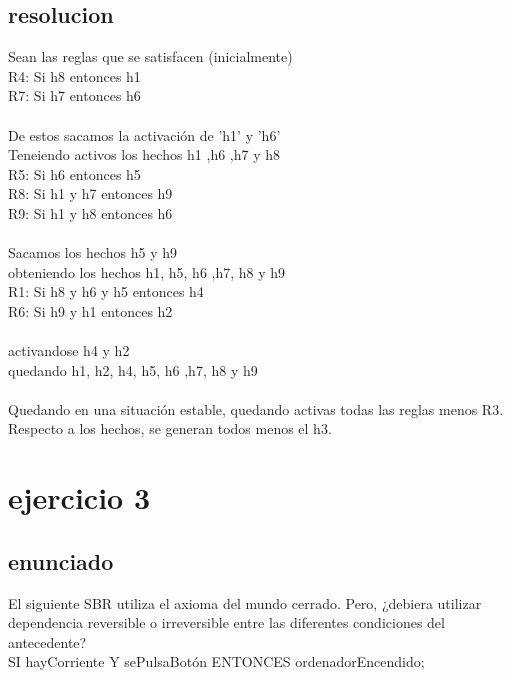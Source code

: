 \documentclass[a4paper,10pt]{article}
\begin{document}
\subsection{resolucion}
Sean las reglas que se satisfacen (inicialmente)
\vspace{0.5cm}\\
R4: Si h8 entonces h1 \\
R7: Si h7 entonces h6 \\
\vspace{0.5cm}\\
De estos sacamos la activación de 'h1' y 'h6'\\
Teneiendo activos los hechos h1 ,h6 ,h7 y h8
\vspace{0.5cm}\\
R5: Si h6 entonces h5 \\
R8: Si h1 y h7 entonces h9 \\
R9: Si h1 y h8 entonces h6 \\
\vspace{0.5cm}\\
Sacamos los hechos h5 y h9\\
obteniendo los hechos h1, h5, h6 ,h7, h8 y h9
\vspace{0.5cm}\\
R1: Si h8 y h6 y h5 entonces h4 \\
R6: Si h9 y h1 entonces h2 \\
\vspace{0.5cm}\\
activandose h4 y h2\\
quedando h1, h2, h4, h5, h6 ,h7, h8 y h9\\
\vspace{0.5cm}\\
Quedando en una situación estable, quedando activas todas las reglas menos R3.\\
Respecto a los hechos, se generan todos menos el h3.\\

\section{ejercicio 3}
\subsection{enunciado}
El siguiente SBR utiliza el axioma del mundo cerrado. Pero, ¿debiera utilizar dependencia reversible o irreversible entre las diferentes condiciones del antecedente?\\
SI hayCorriente Y sePulsaBotón ENTONCES ordenadorEncendido;
\end{document}
